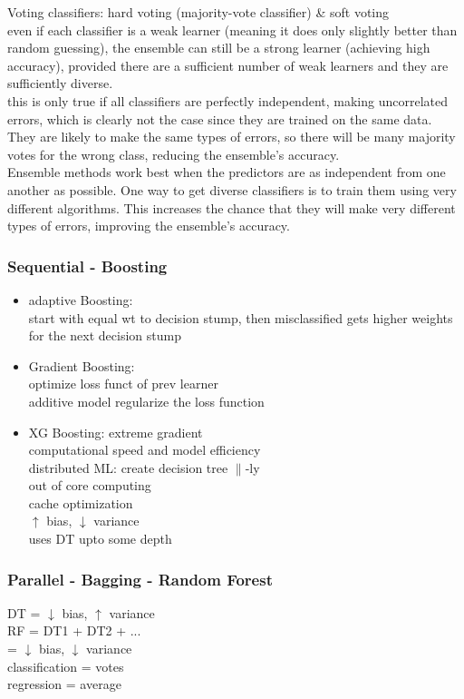 \documentclass{beamer}
\begin{document}
\begin{frame}[allowframebreaks]
Voting classifiers: hard voting (majority-vote classifier) \& soft voting\\
even if each classifier is a weak learner (meaning it does only slightly better than random guessing), the ensemble can still be a strong learner (achieving high accuracy), provided there are a sufficient number of weak learners and they are sufficiently diverse.\\
this is only true if all classifiers are perfectly independent, making uncorrelated errors, which is clearly not the case since they are trained on the same data. They are likely to make the same types of errors, so there will be many majority votes for the wrong class, reducing the ensemble’s accuracy.\\
Ensemble methods work best when the predictors are as independent from one another as possible. One way to get diverse classifiers is to train them using very different algorithms. This increases the chance that they will make very different types of errors, improving the ensemble’s accuracy.
\end{frame}


\begin{frame}\frametitle{Sequential - Boosting}
	\begin{itemize}
		\item adaptive Boosting:\\
		start with equal wt to decision stump, then misclassified gets higher weights for the next decision stump
		\item Gradient Boosting:\\
		optimize loss funct of prev learner\\
		additive model regularize the loss function
		\item XG Boosting: extreme gradient\\
		computational speed and model efficiency\\
		distributed ML: create decision tree $\parallel$-ly\\
		out of core computing\\
		cache optimization\\
		$\uparrow$ bias, $\downarrow$ variance\\
		uses DT upto some depth
	\end{itemize}
\end{frame}

\begin{frame}\frametitle{\hypertarget{rf}{Parallel - Bagging - Random Forest}}
	DT = $\downarrow$ bias, $\uparrow$ variance\\
	RF = DT1 + DT2 + ...\\
	   = $\downarrow$ bias, $\downarrow$ variance\\
	classification = votes\\
	regression = average
\end{frame}
\end{document}
